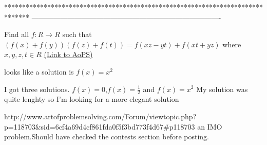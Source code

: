 *******************************************************************************
-------------------------------------------------------------------------------

\begin{problem}
	Find all $f:R\rightarrow R$ such that $(f(x)+f(y))(f(z)+f(t))=f(xz-yt)+f(xt+yz)$ where $x,y,z,t \in R$
	\flushright \href{https://artofproblemsolving.com/community/c6h568693}{(Link to AoPS)}
\end{problem}



\begin{solution}
	looks like a solution is $f(x)=x^2$
\end{solution}



\begin{solution}
	I got three solutions.
$f(x)=0$,$f(x)=\frac{1}{2}$ and $f(x)=x^2$
My solution was quite lenghty so I'm looking for a more elegant solution
\end{solution}



\begin{solution}
	http://www.artofproblemsolving.com/Forum/viewtopic.php?p=118703&sid=6cf4a69d4cf861fda0f5f3bd773f4d67#p118703   an IMO problem.Should have checked the contests section before posting.
\end{solution}



